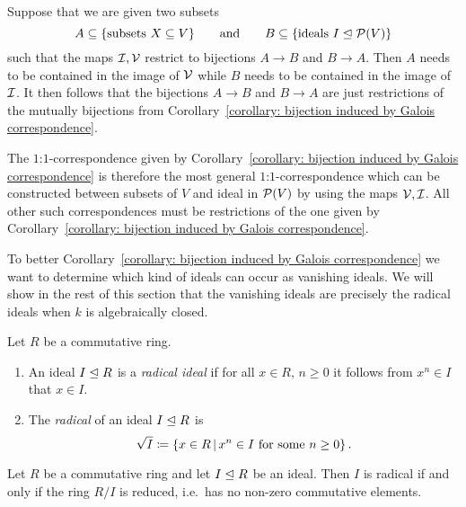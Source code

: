 \begin{fluff}
 Suppose that we are given two subsets
  \[
              A
    \subseteq \{ \text{subsets $X \subseteq V$} \}
    \qquad\text{and}\qquad
              B
    \subseteq \{ \text{ideals $I \trianglelefteq \mathcal{P}(V)$} \}
  \]
  such that the maps $\mathcal{I}, \mathcal{V}$ restrict to bijections $A \to B$ and $B \to A$.
  Then $A$ needs to be contained in the image of $\mathcal{V}$ while $B$ needs to be contained in the image of $\mathcal{I}$.
  It then follows that the bijections $A \to B$ and $B \to A$ are just restrictions of the mutually bijections from Corollary~\ref{corollary: bijection induced by Galois correspondence}.
  
  The $1$:$1$-correspondence given by Corollary~\ref{corollary: bijection induced by Galois correspondence} is therefore the most general $1$:$1$-correspondence which can be constructed between subsets of $V$ and ideal in $\mathcal{P}(V)$ by using the maps $\mathcal{V}, \mathcal{I}$.
  All other such correspondences must be restrictions of the one given by Corollary~\ref{corollary: bijection induced by Galois correspondence}.
  
  To better Corollary~\ref{corollary: bijection induced by Galois correspondence} we want to determine which kind of ideals can occur as vanishing ideals.
  We will show in the rest of this section that the vanishing ideals are precisely the radical ideals when $k$ is algebraically closed.
\end{fluff}


\begin{definition}
  Let $R$ be a commutative ring.
  \begin{enumerate}
    \item
      An ideal $I \trianglelefteq R$ is a \emph{radical ideal} if for all $x \in R$, $n \geq 0$ it follows from $x^n \in I$ that $x \in I$.
    \item
      The \emph{radical} of an ideal $I \trianglelefteq R$ is
      \[
                  \rad{I}
        \defined  \{
                    x \in R
                  \suchthat
                    \text{$x^n \in I$ for some $n \geq 0$}
                  \} \,.
      \]
  \end{enumerate}
\end{definition}


\begin{lemma}
  Let $R$ be a commutative ring and let $I \trianglelefteq R$ be an ideal.
  Then $I$ is radical if and only if the ring $R/I$ is reduced, i.e.\ has no non-zero commutative elements.
\end{lemma}


